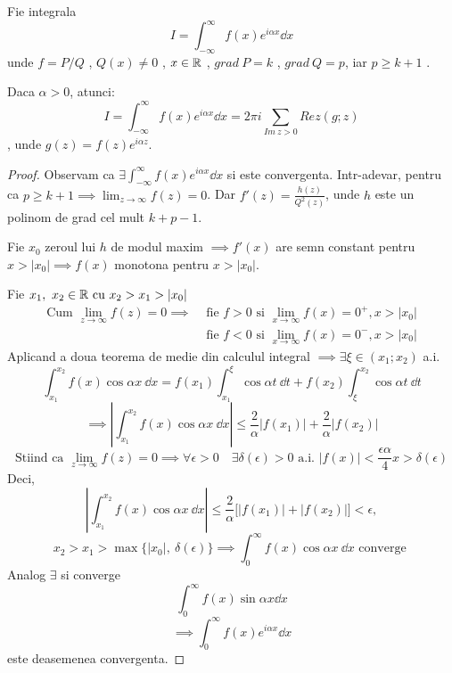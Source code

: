 \begin{tip}
    Fie integrala
    \[
        I = \int_{-\infty}^{\infty} f(x) e^{i \alpha x}\dd x
    \]
    unde $f=P/Q$ , $Q(x)\neq 0$ , $x \in \mathbb{R}$ , $grad\ P = k$ , $grad\ Q =p$,
    iar $p \geq k+1$ .

    Daca $\alpha > 0$, atunci:
    \[
        I = \int_{-\infty}^{\infty} f(x) e^{i \alpha x}\dd x
            =2 \pi i \sum_{Im\ z >0} Rez(g;z)
    \]
    , unde $g(z) = f(z) e^{i \alpha z}$.

    \begin{proof}
        Observam ca
        $\displaystyle
            \exists \int_{-\infty}^{\infty} f(x) e^{i \alpha x}\dd x
        $
        si este convergenta.
        Intr-adevar, pentru ca $\displaystyle p\geq k+1 \implies \lim_{z\to\infty}f(z) = 0$.
        Dar $\displaystyle f'(z) = \frac{h(z)}{Q^2(z)}$, unde $h$ este un polinom
        de grad cel mult $k+p-1$.

        Fie $x_0$ zeroul lui $h$ de modul maxim $\implies f'(x)$
        are semn constant pentru $x>|x_0| \implies f(x) $ monotona pentru $x>|x_0|$.

        Fie $x_1,\ x_2 \in \mathbb{R} \text{ cu } x_2 > x_1 > |x_0|$
        \[
            \begin{aligned}
            \text{Cum } \lim_{z\to\infty} f(z) = 0 \implies
                &\text{ fie } f>0 \text{ si } \lim_{x\to\infty} f(x) = 0^+ , x >|x_0|\\
                &\text{ fie } f<0 \text{ si } \lim_{x\to\infty} f(x) = 0^- , x >|x_0|
            \end{aligned}
        \]
        Aplicand a doua teorema de medie din calculul integral
        $\implies \exists \xi \in (x_1;x_2)$ a.i.
        \[
            \int_{x_1}^{x_2} f(x) \cos \alpha x\ \dd x
                = f(x_1) \int_{x_1}^{\xi} \cos \alpha t\ \dd t
                + f(x_2) \int_{\xi}^{x_2} \cos \alpha t\ \dd t
        \]
        \[
            \implies \left | \int_{x_1}^{x_2} f(x) \cos \alpha x\ \dd x  \right |
                \leq \frac{2}{\alpha} |f(x_1)| + \frac{2}{\alpha} |f(x_2)|
        \]
        \[
            \text{Stiind ca } \lim_{z\to\infty} f(z) = 0 \implies
                \forall \epsilon > 0 \quad \exists \delta(\epsilon) > 0 \text{ a.i. } |f(x)|<\frac{\epsilon \alpha }{4}
            x > \delta(\epsilon)
        \]
        Deci,
        \[
            \left | \int_{x_1}^{x_2} f(x) \cos \alpha x\ \dd x  \right |
                \leq \frac{2}{\alpha} \big[ |f(x_1)|+ |f(x_2)| \big] < \epsilon ,
        \]
        \[
            x_2 > x_1 > \max\{|x_0|,\ \delta(\epsilon)\}
                \implies \int_{0}^{\infty} f(x)\cos \alpha x\ \dd x
                \text{ converge }
        \]
        Analog $\exists$ si converge
        \[
            \int_{0}^{\infty} f(x)\sin \alpha x \dd x
        \]
        \[
            \implies \int_{0}^{\infty} f(x) e^{i \alpha x} \dd x
        \]
        este deasemenea convergenta.


\end{proof}
\end{tip}

